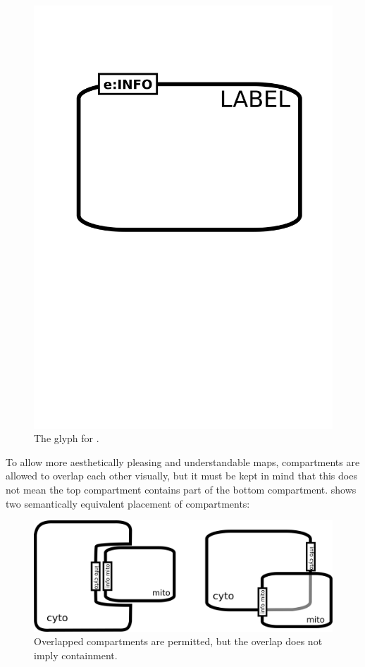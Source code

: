 \begin{figure}[H]
  \centering
  \includegraphics[scale = 0.3]{images/compartment}
  \caption{The \PD glyph for .}
  \label{fig:compartment}
\end{figure}


To allow more aesthetically pleasing and understandable maps, compartments are allowed to overlap each other visually, but it must be kept in mind that this does not mean the top compartment contains part of the bottom compartment.   shows two semantically equivalent placement of compartments:

\begin{figure}[H]
  \centering
  \includegraphics[scale = 0.4]{examples/compartment_overlapping}
  \caption{Overlapped compartments are permitted, but the overlap does not imply containment.}
  \label{fig:overlap}
\end{figure}

